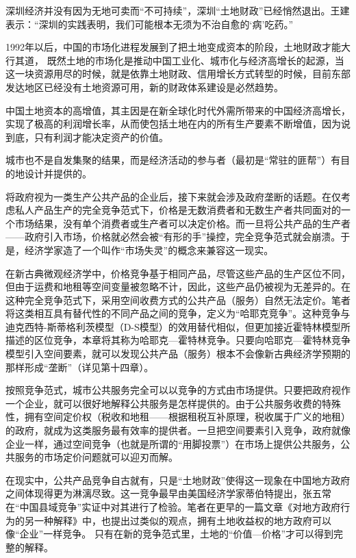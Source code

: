深圳经济并没有因为无地可卖而“不可持续”，深圳“土地财政”已经悄然退出。王建表示：“深圳的实践表明，我们可能根本无须为不治自愈的‘病’吃药。”

1992年以后，中国的市场化进程发展到了把土地变成资本的阶段，土地财政才能大行其道，
既然土地的市场化是推动中国工业化、城市化与经济高增长的起源，当这一块资源用尽的时候，就是依靠土地财政、信用增长方式转型的时候，目前东部发达地区已经没有土地资源可用，新的财政体系建设是必然趋势。

中国土地资本的高增值，其主因是在新全球化时代外需所带来的中国经济高增长，实现了极高的利润增长率，从而使包括土地在内的所有生产要素不断增值，因为说到底，只有利润才能决定资产的价值。

城市也不是自发集聚的结果，而是经济活动的参与者（最初是“常驻的匪帮”）有目的地设计并提供的。

将政府视为一类生产公共产品的企业后，接下来就会涉及政府垄断的话题。在仅考虑私人产品生产的完全竞争范式下，价格是无数消费者和无数生产者共同面对的一个市场结果，没有单个消费者或生产者可以决定价格。而一旦将公共产品的生产者——政府引入市场，价格就必然会被“有形的手”操控，完全竞争范式就会崩溃。于是，经济学家造了一个叫作“市场失灵”的概念来兼容这一现实。

在新古典微观经济学中，价格竞争基于相同产品，尽管这些产品的生产区位不同，但由于运费和地租等空间变量被忽略不计，因此，这些产品仍被视为无差异的。在这种完全竞争范式下，采用空间收费方式的公共产品（服务）自然无法定价。笔者将这类相互具有替代性的不同产品之间的竞争，定义为“哈耶克竞争”。这种竞争与迪克西特-斯蒂格利茨模型（D-S模型）的效用替代相似，但更加接近霍特林模型所描述的区位竞争，本章将其称为哈耶克—霍特林竞争。只要向哈耶克—霍特林竞争模型引入空间要素，就可以发现公共产品（服务）根本不会像新古典经济学预期的那样形成“垄断”（详见第十四章）。

按照竞争范式，城市公共服务完全可以以竞争的方式由市场提供。只要把政府视作一个企业，就可以很好地解释公共服务是怎样提供的。由于公共服务收费的特殊性，拥有空间定价权（税收和地租——根据租税互补原理，税收属于广义的地租）的政府，就成为这类服务最有效率的提供者。一旦把空间要素引入竞争，政府就像企业一样，通过空间竞争（也就是所谓的“用脚投票”）在市场上提供公共服务，公共服务的市场定价问题就可以迎刃而解。

在现实中，公共产品竞争自古就有，只是“土地财政”使得这一现象在中国地方政府之间体现得更为淋漓尽致。这一竞争最早由美国经济学家蒂伯特提出，张五常在“中国县域竞争”实证中对其进行了检验。笔者在更早的一篇文章《对地方政府行为的另一种解释》中，也提出过类似的观点，拥有土地收益权的地方政府可以像“企业”一样竞争。
只有在新的竞争范式里，土地的“价值—价格”才可以得到完整的解释。


